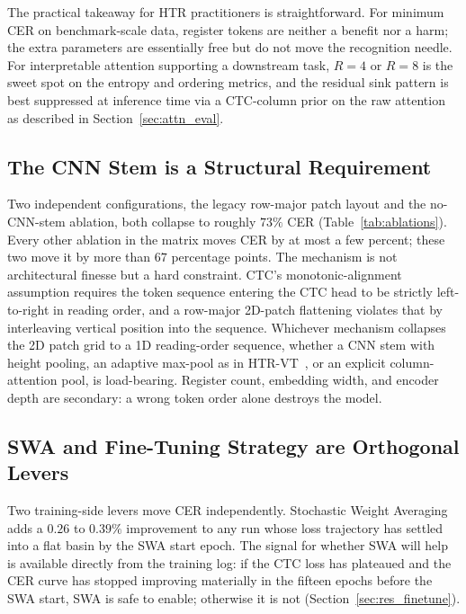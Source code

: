 The practical takeaway for HTR practitioners is straightforward. For minimum CER on benchmark-scale data, register tokens are neither a benefit nor a harm; the extra parameters are essentially free but do not move the recognition needle. For interpretable attention supporting a downstream task, $R = 4$ or $R = 8$ is the sweet spot on the entropy and ordering metrics, and the residual sink pattern is best suppressed at inference time via a CTC-column prior on the raw attention as described in Section~\ref{sec:attn_eval}.

\subsection{The CNN Stem is a Structural Requirement}
\label{sec:disc_cnnstem}

Two independent configurations, the legacy row-major patch layout and the no-CNN-stem ablation, both collapse to roughly $73\%$ CER (Table~\ref{tab:ablations}). Every other ablation in the matrix moves CER by at most a few percent; these two move it by more than $67$ percentage points. The mechanism is not architectural finesse but a hard constraint. CTC's monotonic-alignment assumption requires the token sequence entering the CTC head to be strictly left-to-right in reading order, and a row-major 2D-patch flattening violates that by interleaving vertical position into the sequence. Whichever mechanism collapses the 2D patch grid to a 1D reading-order sequence, whether a CNN stem with height pooling, an adaptive max-pool as in HTR-VT~\cite{li2024htrvt}, or an explicit column-attention pool, is load-bearing. Register count, embedding width, and encoder depth are secondary: a wrong token order alone destroys the model.

\subsection{SWA and Fine-Tuning Strategy are Orthogonal Levers}
\label{sec:disc_swa_ft}

Two training-side levers move CER independently. Stochastic Weight Averaging~\cite{izmailov2018swa} adds a $0.26$ to $0.39\%$ improvement to any run whose loss trajectory has settled into a flat basin by the SWA start epoch. The signal for whether SWA will help is available directly from the training log: if the CTC loss has plateaued and the CER curve has stopped improving materially in the fifteen epochs before the SWA start, SWA is safe to enable; otherwise it is not (Section~\ref{sec:res_finetune}).


